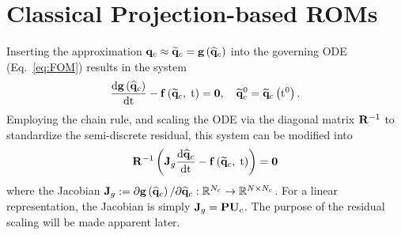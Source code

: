 \section{Classical Projection-based ROMs}\label{sec:classicROMs}

Inserting the approximation $\mathbf{q}_{c} \approx \mathbf{\widetilde{q}}_{c} = \mathbf{g} \left(\mathbf{\widehat{q}}_{c}\right)$ into the governing ODE (Eq.~\ref{eq:FOM}) results in the system
%
\begin{equation}\label{eq:romFullODE}
    \frac{\text{d} \mathbf{g} \left(\mathbf{\widehat{q}}_{c}\right)}{\text{d} \text{t}} - \mathbf{f} \left(\mathbf{\widetilde{q}}_{c}, \; \text{t}\right) = \mathbf{0}, \quad \mathbf{\widetilde{q}}_{c}^0 = \mathbf{\widetilde{q}}_{c} \left(\text{t}^0\right).
\end{equation}
%
Employing the chain rule, and scaling the ODE via the diagonal matrix $\resScaleInv$ to standardize the semi-discrete residual, this system can be modified into
%
\begin{equation}\label{eq:romFullODEMod}
    \resScaleInv \left( \jacobDecode \ode{\consVecCoef}{\timeVar} - \rhsFunc{\consVecRom, \; \timeVar} \right) = \zeroVec
\end{equation}
%
where the Jacobian $\mathbf{J}_{g} := \partial \mathbf{g} \left(\mathbf{\widehat{q}}_{c}\right) / \partial \mathbf{\widehat{q}}_{c}: \mathbb{R}^{N_c} \rightarrow \mathbb{R}^{N \times N_c}$. For a linear representation, the Jacobian is simply $\jacobDecode = \consScale \consTrial$. The purpose of the residual scaling will be made apparent later.

